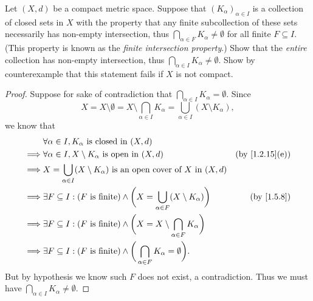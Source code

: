 \begin{ex}\label{ex:1.5.15}
  Let \((X, d)\) be a compact metric space.
  Suppose that \((K_{\alpha})_{\alpha \in I}\) is a collection of closed sets in \(X\) with the property that any finite subcollection of these sets necessarily has non-empty intersection, thus \(\bigcap_{\alpha \in F} K_{\alpha} \neq \emptyset\) for all finite \(F \subseteq I\).
  (This property is known as the \emph{finite intersection property}.)
  Show that the \emph{entire} collection has non-empty intersection, thus \(\bigcap_{\alpha \in I} K_{\alpha} \neq \emptyset\).
  Show by counterexample that this statement fails if \(X\) is not compact.
\end{ex}

\begin{proof}
  Suppose for sake of contradiction that \(\bigcap_{\alpha \in I} K_\alpha = \emptyset\).
  Since
  \[
    X = X \setminus \emptyset = X \setminus \bigcap_{\alpha \in I} K_\alpha = \bigcup_{\alpha \in I} (X \setminus K_\alpha),
  \]
  we know that
  \begin{align*}
             & \forall \alpha \in I, K_\alpha \text{ is closed in } (X, d)                                                                                      \\
    \implies & \forall \alpha \in I, X \setminus K_\alpha \text{ is open in } (X, d)                                             & \text{(by \cref{1.2.15}(e))} \\
    \implies & X = \bigcup_{\alpha \in I} (X \setminus K_\alpha) \text{ is an open cover of } X \text{ in } (X, d)                                              \\
    \implies & \exists F \subseteq I : (F \text{ is finite}) \land \bigg(X = \bigcup_{\alpha \in F} (X \setminus K_\alpha)\bigg) & \text{(by \cref{1.5.8})}     \\
    \implies & \exists F \subseteq I : (F \text{ is finite}) \land \bigg(X = X \setminus \bigcap_{\alpha \in F} K_\alpha\bigg)                                  \\
    \implies & \exists F \subseteq I : (F \text{ is finite}) \land \bigg(\bigcap_{\alpha \in F} K_\alpha = \emptyset\bigg).
  \end{align*}
  But by hypothesis we know such \(F\) does not exist, a contradiction.
  Thus we must have \(\bigcap_{\alpha \in I} K_\alpha \neq \emptyset\).


\end{proof}

